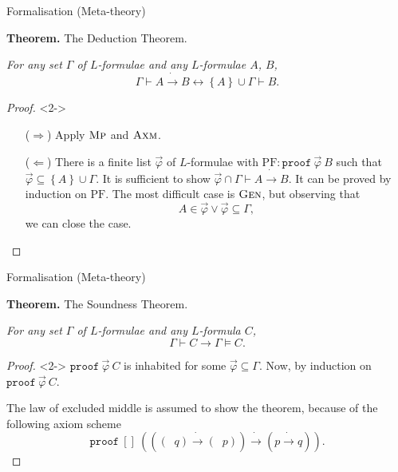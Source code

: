 \documentclass[serif,table,10pt]{beamer}
\newcommand{\0}{\texttt{0}}
\newcommand{\1}{\texttt{1}}
\newcommand{\proves}[2]{\mathtt{proof}\ #1\ #2 }
\newcommand{\listunit}[1]{[#1]}
\newcommand{\Lneg}{\mathop{\dot{\neg}}}
\newcommand{\Lto}{\mathrel{\dot{\to}}}
\begin{document}
\begin{frame}{Formalisation (Meta-theory)}

    \textbf{Theorem.} The Deduction Theorem.

    \emph{For any set $\Gamma$ of $L$-formulae and any $L$-formulae $A$, $B$, \[ \Gamma \vdash A \Lto B \leftrightarrow \left\{ A \right\} \cup \Gamma \vdash B . \]}

    \begin{proof}<2->
        \begin{itemize}
            \item[($\Rightarrow$)] Apply $\textsc{Mp}$ and $\textsc{Axm}$.
            \item[($\Leftarrow$)] There is a finite list $\vec\varphi$ of $L$-formulae with $\mathrm{PF} : \proves{\vec\varphi}{B}$ such that $\vec\varphi \subseteq \left\{ A \right\} \cup \Gamma$. It is sufficient to show $ \vec\varphi \cap \Gamma \vdash A \Lto B $. It can be proved by induction on $\mathrm{PF}$. The most difficult case is $\textsc{Gen}$, but observing that \[ A \in \vec\varphi \lor \vec\varphi \subseteq \Gamma , \] we can close the case.
        \end{itemize}
    \end{proof}

\end{frame}

\begin{frame}{Formalisation (Meta-theory)}

    \textbf{Theorem.} The Soundness Theorem.

    \emph{For any set $\Gamma$ of $L$-formulae and any $L$-formula $C$, \[ \Gamma \vdash C \to \Gamma \vDash C . \]}

    \begin{proof}<2->
        $\proves{\vec\varphi}{C}$ is inhabited for some $\vec\varphi \subseteq \Gamma$. Now, by induction on $\proves{\vec\varphi}{C}$.

        The law of excluded middle is assumed to show the theorem, because of the following axiom scheme $$\proves{ \listunit{} }{ (((\Lneg q) \Lto (\Lneg p)) \Lto (p \Lto q)) } .$$
    \end{proof}

\end{frame}
\end{document}
